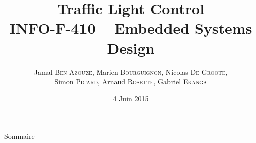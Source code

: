 \documentclass{bredelebeamer}
\begin{document}
\title[INFO-F-410 - Traffic Light Control]{\textbf{Traffic Light Control} \\INFO-F-410 -- Embedded Systems Design} %

\author[]{Jamal \textsc{Ben Azouze}, Marien \textsc{Bourguignon}, Nicolas \textsc{De Groote}, \\Simon \textsc{Picard}, Arnaud \textsc{Rosette}, Gabriel \textsc{Ekanga}}
\date{4 Juin 2015} %

\begin{frame}
\titlepage %
\end{frame}

\begin{frame}{Sommaire}
\tableofcontents %
\end{frame}
\end{document}
